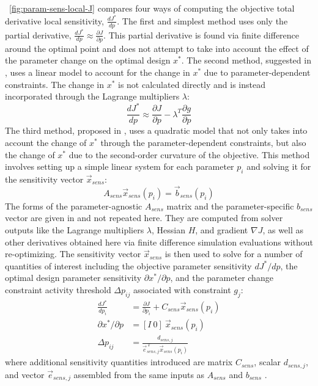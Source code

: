 \figureautorefname~\ref{fig:param-sens-local-J} compares four ways of computing the objective total derivative local sensitivity, $\frac{dJ^*}{dp}$.
The first and simplest method uses only the partial derivative, $\frac{dJ^*}{dp}\approx \frac{\partial J}{\partial p}$.
This partial derivative is found via finite difference around the optimal point and does not attempt to take into account the effect of the parameter change on the optimal design $x^*$.
The second method, suggested in \cite{martins_engineering_2022}, uses a linear model to account for the change in $x^*$ due to parameter-dependent constraints.
The change in $x^*$ is not calculated directly and is instead incorporated through the Lagrange multipliers $\lambda$:
\begin{equation}
\frac{dJ^*}{dp} \approx \frac{\partial J}{\partial p} -  \lambda^T \frac{\partial g}{\partial p}
\end{equation}
The third method, proposed in \cite{sobieszczanski-sobieski_sensitivity_1982}, uses a quadratic model that not only takes into account the change of $x^*$ through the parameter-dependent constraints, but also the change of $x^*$ due to the second-order curvature of the objective.
This method involves setting up a simple linear system for each parameter $p_i$ and solving it for the sensitivity vector $\vec{x}_{sens}$:
\begin{equation}
    A_{sens} \vec{x}_{sens}(p_i) = \vec{b}_{sens}(p_i)
\end{equation}
The forms of the parameter-agnostic $A_{sens}$ matrix and the parameter-specific $b_{sens}$ vector are given in \cite{sobieszczanski-sobieski_sensitivity_1982} and not repeated here.
They are computed from solver outputs like the Lagrange multipliers $\lambda$, Hessian $H$, and gradient $\nabla  J$, as well as other derivatives %
obtained here via finite difference simulation evaluations %
without re-optimizing.
The sensitivity vector $\vec{x}_{sens}$ is then used to solve for a number of quantities of interest including the objective parameter sensitivity $dJ^*/dp$, the optimal design parameter sensitivity $\partial x^*/\partial p$, and the parameter change constraint activity threshold $\Delta p_{ij}$ associated with constraint $g_j$:
\begin{equation}
\begin{aligned}
    \frac{dJ^*}{dp_i} &=  \frac{\partial J}{\partial p_i} + C_{sens}\vec{x}_{sens}(p_i) \\
    \partial x^*/\partial p &=  [I ~0] ~\vec{x}_{sens}(p_i) \\
    \Delta p_{ij} &= \frac{d_{sens,j}}{\vec{e}_{sens,j}^{~T}\vec{x}_{sens}(p_i)}
\end{aligned}
\end{equation}
where additional sensitivity quantities introduced are matrix $C_{sens}$, scalar $d_{sens,j}$, and vector $\vec{e}_{sens,j}$ assembled from the same inputs as $A_{sens}$ and $b_{sens}$ \cite{sobieszczanski-sobieski_sensitivity_1982}.

